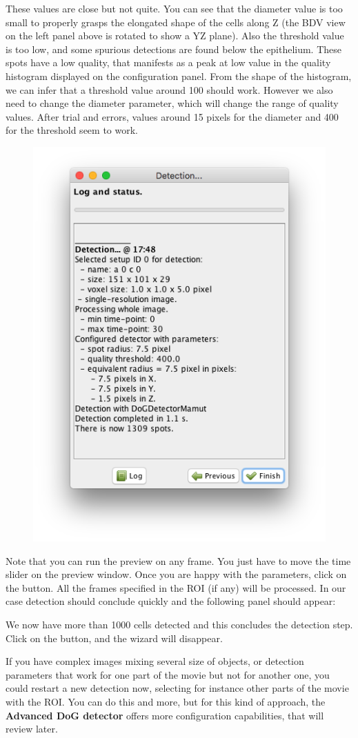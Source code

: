 These values are close but not quite.
You can see that the diameter value is too small to properly grasps the elongated shape of the cells along Z (the BDV view on the left panel above is rotated to show a YZ plane). 
Also the threshold value is too low, and some spurious detections are found below the epithelium.
These spots have a low quality, that manifests as a peak at low value in the quality histogram displayed on the configuration panel.
From the shape of the histogram, we can infer that a threshold value around 100 should work.
However we also need to change the diameter parameter, which will change the range of quality values.
After trial and errors, values around 15 pixels for the diameter and 400 for the threshold seem to work.

\begin{figure}
    \centering
    \includegraphics[height=0.40\textwidth, trim=0.5cm 0.5cm .5cm .5cm, clip]{figures/Mastodon_DetectionResuts.png}
\end{figure}

Note that you can run the preview on any frame.
You just have to move the time slider on the preview window.
Once you are happy with the parameters, click on the  button.
All the frames specified in the ROI (if any) will be processed. 
In our case detection should conclude quickly and the following panel should appear:

We now have more than 1000 cells detected and this concludes the detection step.
Click on the  button, and the wizard will disappear.

If you have complex images mixing several size of objects, or detection parameters that work for one part of the movie but not for another one, you could restart a new detection now, selecting for instance other parts of the movie with the ROI.
You can do this and more, but for this kind of approach, the \textbf{Advanced DoG detector} offers more configuration capabilities, that will review later.



